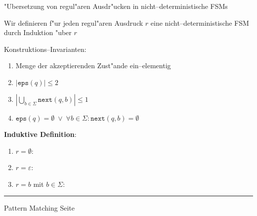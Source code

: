 \begin{slide}{}
\normalsize

\begin{center}
"Ubersetzung von regul"aren Ausdr"ucken in
nicht--deterministische FSMs
\end{center}
\vspace*{0.5cm}

\footnotesize
Wir definieren f"ur jeden regul"aren Ausdruck $r$ eine
nicht--deterministische FSM durch Induktion "uber $r$

Konstruktions--Invarianten:
\begin{enumerate}
\item Menge der akzeptierenden Zust"ande ein--elementig
\item $|\mathtt{eps}(q)|    \leq 2$
\item $|\bigcup\limits_{b\in\Sigma} \mathtt{next}(q,b)| \leq 1$
\item $\mathtt{eps}(q) = \emptyset \;\vee\; \forall b\in\Sigma:\mathtt{next}(q,b) = \emptyset$
\end{enumerate}
\textbf{Induktive Definition}:
\begin{enumerate}
\item $r = \emptyset$: 

            \hspace*{1.3cm} 
\item $r = \varepsilon$: 

            \hspace*{1.3cm} 
\item $r = b$ mit $b \in \Sigma$: 

            \hspace*{1.3cm} 
      \vspace*{0.5cm}
\end{enumerate}


\vspace*{\fill}
\tiny \addtocounter{mypage}{1}
\rule{17cm}{1mm}
Pattern Matching \hspace*{\fill} Seite 
\end{slide}


